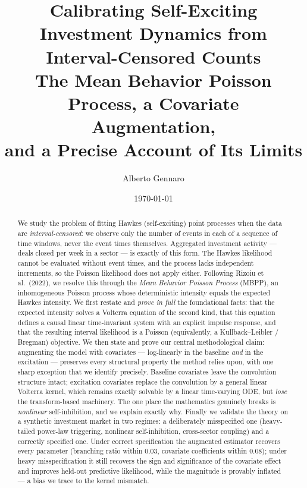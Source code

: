 \documentclass[11pt]{article}
\title{\bfseries Calibrating Self-Exciting Investment Dynamics from
Interval-Censored Counts\\[4pt]
\large The Mean Behavior Poisson Process, a Covariate Augmentation,\\
and a Precise Account of Its Limits}
\author{Alberto Gennaro}
\date{\today}
\theoremstyle{plain}
\theoremstyle{definition}
\theoremstyle{remark}
\begin{document}
\maketitle

\begin{abstract}
\noindent
We study the problem of fitting Hawkes (self-exciting) point processes when the
data are \emph{interval-censored}: we observe only the number of events in each
of a sequence of time windows, never the event times themselves. Aggregated
investment activity --- deals closed per week in a sector --- is exactly of this
form. The Hawkes likelihood cannot be evaluated without event times, and the
process lacks independent increments, so the Poisson likelihood does not apply
either. Following Rizoiu et al.\ (2022), we resolve this through the \emph{Mean
Behavior Poisson Process} (MBPP), an inhomogeneous Poisson process whose
deterministic intensity equals the expected Hawkes intensity. We first restate
and \emph{prove in full} the foundational facts: that the expected intensity
solves a Volterra equation of the second kind, that this equation defines a
causal linear time-invariant system with an explicit impulse response, and that
the resulting interval likelihood is a Poisson (equivalently, a Kullback--Leibler
/ Bregman) objective. We then state and prove our central methodological claim:
augmenting the model with covariates --- log-linearly in the baseline
\emph{and} in the excitation --- preserves every structural property the method
relies upon, with one sharp exception that we identify precisely. Baseline
covariates leave the convolution structure intact; excitation covariates replace
the convolution by a general linear Volterra kernel, which remains exactly
solvable by a linear time-varying ODE, but \emph{lose} the transform-based
machinery. The one place the mathematics genuinely breaks is \emph{nonlinear}
self-inhibition, and we explain exactly why. Finally we validate the theory on a
synthetic investment market in two regimes: a deliberately misspecified one
(heavy-tailed power-law triggering, nonlinear self-inhibition, cross-sector
coupling) and a correctly specified one. Under correct specification the
augmented estimator recovers every parameter (branching ratio within $0.03$,
covariate coefficients within $0.08$); under heavy misspecification it still
recovers the sign and significance of the covariate effect and improves held-out
predictive likelihood, while the magnitude is provably inflated --- a bias we
trace to the kernel mismatch.
\end{abstract}
\end{document}
